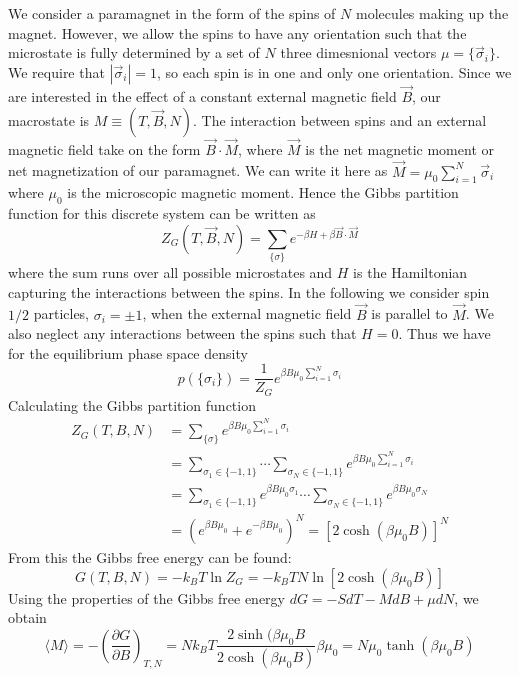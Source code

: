 \documentclass[12pt, a4paper, oneside, openright, titlepage]{book}
\begin{document}
We consider a paramagnet in the form of the spins of $N$ molecules making up the magnet. However, we allow the spins to have any orientation such that the microstate is fully determined by a set of $N$ three dimesnional vectors $\mu = \{\vec{\sigma}_i\}$. We require that $|\vec{\sigma}_i| = 1$, so each spin is in one and only one orientation. Since we are interested in the effect of a constant external magnetic field $\vec{B}$, our macrostate is $M \equiv (T,\vec{B},N)$. The interaction between spins and an external magnetic field take on the form $\vec{B}\cdot \vec{M}$, where $\vec{M}$ is the net magnetic moment or net magnetization of our paramagnet. We can write it here as $\vec{M} = \mu_0\sum_{i=1}^N\vec{\sigma}_i$ where $\mu_0$ is the microscopic magnetic moment. Hence the Gibbs partition function for this discrete system can be written as \begin{equation*}
    Z_G(T,\vec{B},N) = \sum_{\{\sigma\}}e^{-\beta H + \beta \vec{B}\cdot\vec{M}}
\end{equation*}
where the sum runs over all possible microstates and $H$ is the Hamiltonian capturing the interactions between the spins. In the following we consider spin $1/2$ particles, $\sigma_i = \pm 1$, when the external magnetic field $\vec{B}$ is parallel to $\vec{M}$. We also neglect any interactions between the spins such that $H = 0$. Thus we have for the equilibrium phase space density \begin{equation*}
    p(\{\sigma_i\}) = \frac{1}{Z_G}e^{\beta B\mu_0\sum_{i=1}^N\sigma_i}
\end{equation*}
Calculating the Gibbs partition function \begin{align*}
    Z_G(T,B,N) &= \sum_{\{\sigma\}}e^{\beta B\mu_0\sum_{i=1}^N\sigma_i} \\
    &= \sum_{\sigma_1 \in \{-1,1\}}\cdots \sum_{\sigma_N\in\{-1,1\}}e^{\beta B\mu_0\sum_{i=1}^N\sigma_i} \\
    &=\sum_{\sigma_1 \in \{-1,1\}}e^{\beta B\mu_0\sigma_1}\cdots \sum_{\sigma_N\in\{-1,1\}}e^{\beta B\mu_0\sigma_N} \\
    &= (e^{\beta B\mu_0} + e^{-\beta B\mu_0})^N = [2\cosh(\beta \mu_0B)]^N
\end{align*}
From this the Gibbs free energy can be found: \begin{equation*}
    G(T,B,N) = -k_BT\ln Z_G = -k_BTN\ln[2\cosh(\beta\mu_0 B)]
\end{equation*}
Using the properties of the Gibbs free energy $dG = -SdT - MdB+\mu dN$, we obtain \begin{equation*}
    \langle M\rangle = -\left(\frac{\partial G}{\partial B}\right)_{T,N} = Nk_BT\frac{2\sinh(\beta\mu_0 B}{2\cosh(\beta\mu_0B)}\beta\mu_0 = N\mu_0\tanh(\beta\mu_0B)
\end{equation*}
\end{document}
